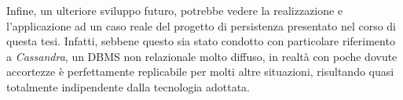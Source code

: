 
	Infine, un ulteriore sviluppo futuro, potrebbe vedere la realizzazione e l'applicazione ad un caso reale del progetto di persistenza presentato nel corso di questa tesi. Infatti, sebbene questo sia stato condotto con particolare riferimento a \textit{Cassandra}, un DBMS non relazionale molto diffuso, in realtà con poche dovute accortezze è perfettamente replicabile per molti altre situazioni, risultando quasi totalmente indipendente dalla tecnologia adottata.